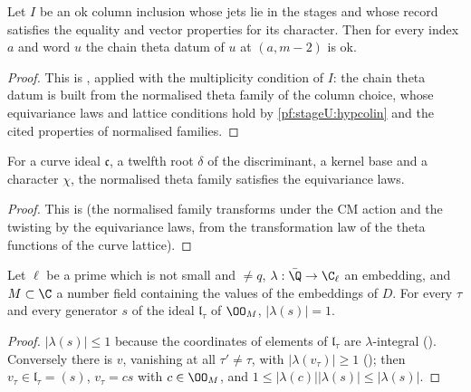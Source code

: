 \begin{lemma}\label{pf:stageU:chthok}
Let $I$ be an ok column inclusion whose jets lie in the stages and whose record satisfies the equality and vector properties for its
character. Then for every index $a$ and word $u$ the chain theta datum of $u$ at $(a,m-2)$ is ok.
\end{lemma}

\begin{proof}
This is , applied with the multiplicity condition of $I$: the chain theta datum is
built from the normalised theta family of the column choice, whose equivariance laws and lattice conditions hold by
\cref{pf:stageU:hypcolin} and the cited properties of normalised families.
\end{proof}

\begin{lemma}\label{pf:stageU:natequi}
For a curve ideal $\mathfrak c$, a twelfth root $\delta$ of the discriminant, a kernel base and a character $\chi$, the normalised
theta family satisfies the equivariance laws.
\end{lemma}

\begin{proof}
This is  (the normalised family transforms under the CM action and the twisting by the
equivariance laws, from the transformation law of the theta functions of the curve lattice).
\end{proof}

\begin{lemma}\label{pf:stageU:normgen}
Let $\ell$ be a prime which is not small and $\ne q$, $\lambda:\bar\Q\to\C_\ell$ an embedding, and $M\subset\C$ a number field containing the
values of the embeddings of $D$. For every $\tau$ and every generator $s$ of the ideal $\mathfrak l_\tau$ of $\OO_M$, $|\lambda(s)|=1$.
\end{lemma}

\begin{proof}
$|\lambda(s)|\le1$ because the coordinates of elements of $\mathfrak l_\tau$ are $\lambda$-integral
(). Conversely there is $v$, vanishing at all $\tau'\ne\tau$, with $|\lambda(v_\tau)|\ge1$
(); then $v_\tau\in\mathfrak l_\tau=(s)$, $v_\tau=cs$ with $c\in\OO_M$, and
$1\le|\lambda(c)||\lambda(s)|\le|\lambda(s)|$.
\end{proof}

